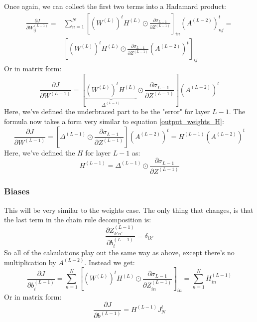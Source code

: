 \documentclass[12pt, a4paper]{article}
\numberwithin{equation}{section}
\begin{document}
Once again, we can collect the first two terms into a Hadamard product:
\begin{align}
\frac{\partial J}{\partial W^{(L-1)}_{ij}}=&\sum_{n=1}^N\left[\left(W^{(L)}\right)^t H^{(L)}\odot\frac{\partial\sigma_{L-1}}{\partial Z^{(L-1)}}\right]_{in}\left(A^{(L-2)}\right)^t_{nj}=\\
&\left[\left(W^{(L)}\right)^t H^{(L)}\odot\frac{\partial\sigma_{L-1}}{\partial Z^{(L-1)}}\left(A^{(L-2)}\right)^t\right]_{ij}
\end{align}
Or in matrix form:
\begin{equation}
\label{last_hidden_weights_matrix}
\frac{\partial J}{\partial W^{(L-1)}}=\left[\underbrace{\left(W^{(L)}\right)^t H^{(L)}}_{\Delta^{(L-1)}}\odot\frac{\partial\sigma_{L-1}}{\partial Z^{(L-1)}}\right]\left(A^{(L-2)}\right)^t
\end{equation}
Here, we've defined the underbraced part to be the "error" for layer $L-1$. The formula now takes a form very similar to equation \ref{output_weights_H}:
\begin{equation}
\frac{\partial J}{\partial W^{(L-1)}}=\left[\Delta^{(L-1)}\odot\frac{\partial\sigma_{L-1}}{\partial Z^{(L-1)}}\right]\left(A^{(L-2)}\right)^t=H^{(L-1)}\left(A^{(L-2)}\right)^t
\end{equation}
Here, we've defined the $H$ for layer $L-1$ as:
\begin{equation}
H^{(L-1)}=\Delta^{(L-1)}\odot\frac{\partial\sigma_{L-1}}{\partial Z^{(L-1)}}
\end{equation}

\subsubsection{Biases}
This will be very similar to the weights case. The only thing that changes, is that the last term in the chain rule decomposition is:
\begin{equation}
\frac{\partial Z^{(L-1)}_{k'n'}}{\partial b^{(L-1)}_i}=\delta_{ik'}
\end{equation}
So all of the calculations play out the same way as above, except there's no multiplication by $A^{(L-2)}$. Instead we get:
\begin{equation}
\frac{\partial J}{\partial b^{(L-1)}_i}=\sum_{n=1}^N\left[\left(W^{(L)}\right)^t H^{(L)}\odot\frac{\partial\sigma_{L-1}}{\partial Z^{(L-1)}_{in}}\right]_{in}=\sum_{n=1}^N H^{(L-1)}_{in}
\end{equation}
Or in matrix form:
\begin{equation}
\frac{\partial J}{\partial b^{(L-1)}}=H^{(L-1)}J^t_N
\end{equation}
\end{document}
